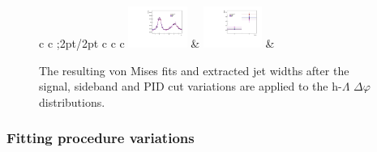 \begin{figure}[ht]
\begin{minipage}{1.1\textwidth}
\begin{tabular}{c c ;{2pt/2pt} c c c}
            \includegraphics[width=0.17\textwidth]{figures/analysis/pid_variations_width_50_80_highpt.pdf} &
            \includegraphics[width=0.17\textwidth]{figures/analysis/pid_variations_width_50_80_highpt_widths.pdf} &  \\
        \end{tabular}
    \end{minipage}
    \caption{The resulting von Mises fits and extracted jet widths after the signal, sideband and PID cut variations are applied to the h-$\Lambda$ $\Delta\varphi$ distributions.}
    \label{fig:cut_variations_widths}
\end{figure}

\subsubsection{Fitting procedure variations}
\label{sec:fitting_procedure_systematics_width}

